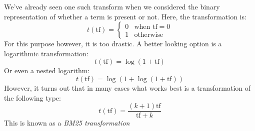 \documentclass[12pt, a4paper]{article}
\numberwithin{equation}{section}
\begin{document}
We've already seen one such transform when we considered the binary representation of whether a term is present or not. Here, the transformation is:
\begin{equation}
t(\textrm{tf})=
\begin{cases}
0 & \textrm{when }\textrm{tf}=0 \\
1 & \textrm{otherwise}
\end{cases}
\end{equation}
For this purpose however, it is too drastic. A better looking option is a logarithmic transformation:
\begin{equation}
t(\textrm{tf})=\log(1+\textrm{tf})
\end{equation}
Or even a nested logarithm:
\begin{equation}
t(\textrm{tf})=\log(1+\log(1+\textrm{tf}))
\end{equation}
However, it turns out that in many cases what works best is a transformation of the following type:
\begin{equation}
t(\textrm{tf})=\frac{(k+1)\textrm{tf}}{\textrm{tf}+k}
\end{equation}
This is known as a \textit{BM25 transformation}
\end{document}
